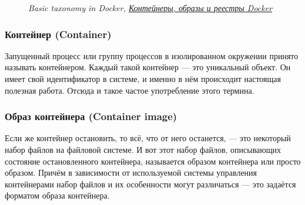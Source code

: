 \documentclass[14pt, a4paper]{article}
\begin{document}
\begin{figure}[h]%
    \centering
    \caption*{\textit{Basic taxonomy in Docker, \href{https://docs.microsoft.com/ru-ru/dotnet/architecture/microservices/container-docker-introduction/docker-containers-images-registries}{Контейнеры, образы и реестры Docker}}\\}
    \label{1.1} %
\end{figure}


\subsubsection*{Контейнер (Container)}

Запущенный процесс или группу процессов в изолированном окружении принято называть
контейнером. Каждый такой контейнер — это уникальный объект. Он имеет свой идентификатор в
системе, и именно в нём происходит настоящая полезная работа. Отсюда и такое частое
употребление этого термина.\\


\subsubsection*{Образ контейнера (Container image)}

Если же контейнер остановить, то всё, что от него останется, — это некоторый набор файлов на
файловой системе. И вот этот набор файлов, описывающих состояние остановленного контейнера,
называется образом контейнера или просто образом. Причём в зависимости от используемой
системы управления контейнерами набор файлов и их особенности могут различаться — это
задаётся форматом образа контейнера.
\end{document}
